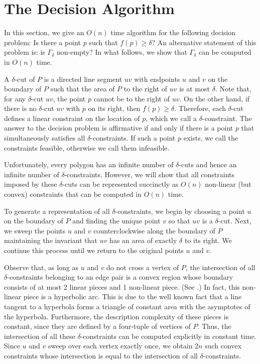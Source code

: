 \documentclass{ws-ijcga}
\begin{document}
\section{The Decision Algorithm}

In this section, we give an $O(n)$ time algorithm for the following
decision problem: Is there a point $p$ such that $f(p)\ge \delta$?  An
alternative statement of this problem is: is $\Gamma_\delta$
non-empty?  In what follows, we show that $\Gamma_\delta$ can be
computed in $O(n)$ time.

A $\delta$-cut of $P$ is a directed line segment $uv$ with endpoints
$u$ and $v$ on the boundary of $P$ such that the area of $P$ to the
right of $uv$ is at most $\delta$.  Note that, for any $\delta$-cut
$uv$, the point $p$ cannot be to the right of $uv$. On the other
hand, if there is no $\delta$-cut $uv$ with $p$ on its right, then
$f(p)\ge\delta$.  Therefore, each $\delta$-cut defines a linear
constraint on the location of $p$, which we call a
$\delta$-constraint.  The answer to the decision problem is
affirmative if and only if there is a point $p$ that simultaneously
satisfies all $\delta$-constraints.  If such a point $p$ exists, we
call the constraints feasible, otherwise we call them infeasible.

Unfortunately, every polygon has an infinite number of $\delta$-cuts
and hence an infinite number of $\delta$-constraints.  However, we
will show that all constraints imposed by these $\delta$-cuts can be
represented succinctly as $O(n)$ non-linear (but convex) constraints
that can be computed in $O(n)$ time.

To generate a representation of all $\delta$-constraints, we begin by
choosing a point $u$ on the boundary of $P$ and finding the unique
point $v$ so that $uv$ is a $\delta$-cut.  Next, we sweep the points
$u$ and $v$ counterclockwise along the boundary of $P$ maintaining the
invariant that $uv$ has an area of exactly $\delta$ to its right.  We
continue this process until we return to the original points $u$ and
$v$.

Observe that, as long as $u$ and $v$ do not cross a vertex of $P$, the
intersection of all $\delta$-constraints belonging to an edge pair is
a convex region whose boundary consists of at most 2 linear pieces and
1 non-linear piece.  (See .) In fact, this
non-linear piece is a hyperbolic arc.  This is due to the well known
fact that a line tangent to a hyperbola forms a triangle of constant
area with the asymptotes of the hyperbola.  Furthermore, the
description complexity of these pieces is constant, since they are
defined by a four-tuple of vertices of $P$.  Thus, the intersection of
all these $\delta$-constraints can be computed explicitly in constant
time.  Since $u$ and $v$ sweep over each vertex exactly once, we
obtain $2n$ such convex constraints whose intersection is equal to the
intersection of all $\delta$-constraints.
\end{document}
